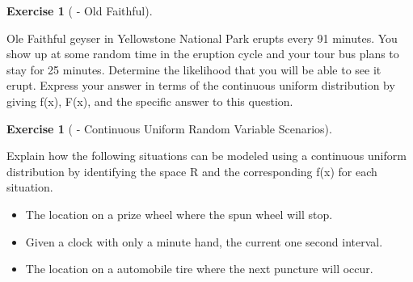 \documentclass[10pt,]{book}
\theoremstyle{plain}
\theoremstyle{definition}
\theoremstyle{definition}
\theoremstyle{definition}
\newtheorem{exercise}[theorem]{Exercise}
\numberwithin{equation}{section}
\begin{document}
\begin{exercise}[{ - Old Faithful}]\label{exercise-34}

Ole Faithful geyser in Yellowstone National Park erupts every 91 minutes. You show up at some random time in the eruption cycle and your tour bus plans to stay for 25 minutes. Determine the likelihood that you will be able to see it erupt.  Express your answer in terms of the continuous uniform distribution by giving f(x), F(x), and the specific answer to this question.
%
\end{exercise}
\begin{exercise}[{ - Continuous Uniform Random Variable Scenarios}]\label{exercise-35}

Explain how the following situations can be modeled using a continuous uniform distribution by identifying the space R and the corresponding f(x) for each situation.
\leavevmode%
\begin{itemize}[label=\textbullet]
\item{}The location on a prize wheel where the spun wheel will stop.%
\item{}Given a clock with only a minute hand, the current one second interval.%
\item{}The location on a automobile tire where the next puncture will occur.%
\end{itemize}

%
\end{exercise}
\end{document}
